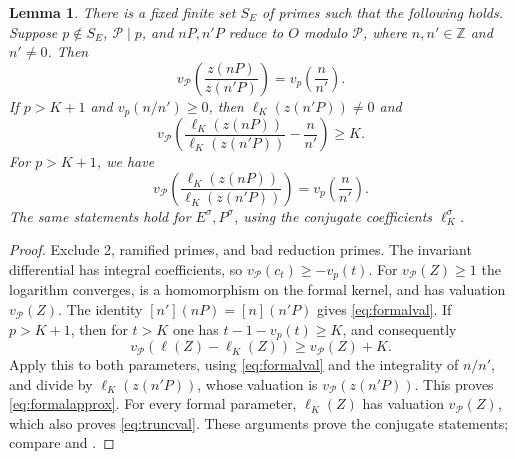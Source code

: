 \documentclass[11pt,reqno]{amsart}
\newtheorem{lemma}[theorem]{Lemma}
\theoremstyle{definition}
\numberwithin{equation}{section}
\newcommand{\Z}{\mathbb Z}
\def\l{\left}
\def\r{\right}
\def\f{\frac}
\begin{document}
\begin{lemma}\label{lem:formal}
There is a fixed finite set $S_E$ of primes such that the following holds. 
Suppose $p\notin S_E$, $\mathcal P\mid p$, and $nP,n'P$ reduce to $O$ modulo $\mathcal P$, where $n,n'\in\Z$ and $n'\ne0$. Then
\begin{equation}\label{eq:formalval}
 v_{\mathcal P}\left(\frac{z(nP)}{z(n'P)}\right)=v_p\l(\f n{n'}\r).
\end{equation}
If $p>K+1$ and $v_p(n/n')\ge0$, then $\ell_K(z(n'P))\ne0$ and
\begin{equation}\label{eq:formalapprox}
 v_{\mathcal P}\left(\frac{\ell_K(z(nP))}{\ell_K(z(n'P))}-\frac n{n'}\right)\ge K.
\end{equation}
For $p>K+1$, we have
\begin{equation}\label{eq:truncval}
 v_{\mathcal P}\left(\frac{\ell_K(z(nP))}{\ell_K(z(n'P))}\right)=v_p\l(\f n{n'}\r).
\end{equation}
The same statements hold for $E^\sigma,P^\sigma$, using the conjugate coefficients $\ell_K^\sigma$.
\end{lemma}
\begin{proof}
Exclude 2, ramified primes, and bad reduction primes. The invariant differential has integral coefficients, so $v_{\mathcal P}(c_t)\ge-v_p(t)$. For $v_{\mathcal P}(Z)\ge1$ the logarithm converges, is a homomorphism on the formal kernel, and has valuation $v_{\mathcal P}(Z)$. The identity $[n'](nP)=[n](n'P)$ gives \eqref{eq:formalval}. If $p>K+1$, then for $t>K$ one has $t-1-v_p(t)\ge K$, and consequently
\[
 v_{\mathcal P}(\ell(Z)-\ell_K(Z))\ge v_{\mathcal P}(Z)+K.
\]
Apply this to both parameters, using \eqref{eq:formalval} and the integrality of $n/n'$, and divide by $\ell_K(z(n'P))$, whose valuation is $v_{\mathcal P}(z(n'P))$. This proves \eqref{eq:formalapprox}. For every formal parameter, $\ell_K(Z)$ has valuation $v_{\mathcal P}(Z)$, which also proves \eqref{eq:truncval}. These arguments prove the conjugate statements; compare \cite[Proposition 2.2]{OAI} and \cite[Chapter IV]{Silv}.
\end{proof}
\end{document}
